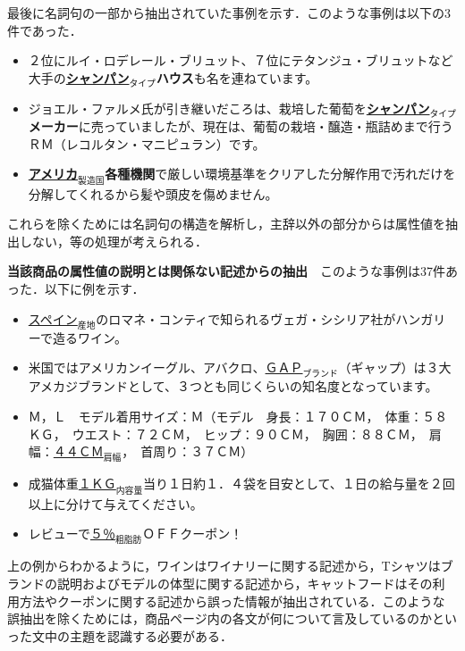 \documentclass[japanese]{jnlp_1.4}
\begin{document}
最後に名詞句の一部から抽出されていた事例を示す．このような事例は以下の3件であった．

\begin{itemize}
\item ２位にルイ・ロデレール・ブリュット、７位にテタンジュ・ブリュットなど　大手の{\bf \underline{シャンパン}$_{タイプ}$ハウス}も名を連ねています。
\item ジョエル・ファルメ氏が引き継いだころは、栽培した葡萄を{\bf \underline{シャンパン}$_{タイプ}$メーカー}に売っていましたが、現在は、葡萄の栽培・醸造・瓶詰めまで行うＲＭ（レコルタン・マニピュラン）です。
\item {\bf \underline{アメリカ}$_{製造国}$各種機関}で厳しい環境基準をクリアした分解作用で汚れだけを分解してくれるから髪や頭皮を傷めません。
\end{itemize}

\noindent
これらを除くためには名詞句の構造を解析し，主辞以外の部分からは属性値を抽出しない，等の処理が考えられる．


\vspace{1\Cvs}
\noindent
\textbf{当該商品の属性値の説明とは関係ない記述からの抽出}　このような事例は37件あった．以下に例を示す．

\begin{itemize}
\item \underline{スペイン}$_{産地}$のロマネ・コンティで知られるヴェガ・シシリア社がハンガリーで造るワイン。
\item 米国ではアメリカンイーグル、アバクロ、\underline{ＧＡＰ}$_{ブランド}$（ギャップ）は３大アメカジブランドとして、３つとも同じくらいの知名度となっています。
\item Ｍ，Ｌ　モデル着用サイズ：Ｍ（モデル　身長：１７０ＣＭ，　体重：５８ＫＧ，　ウエスト：７２ＣＭ，　ヒップ：９０ＣＭ，　胸囲：８８ＣＭ，　肩幅：\underline{４４ＣＭ}$_{肩幅}$，　首周り：３７ＣＭ）
\item 成猫体重\underline{１ＫＧ}$_{内容量}$当り１日約１．４袋を目安として、１日の給与量を２回以上に分けて与えてください。
\item レビューで\underline{５％}$_{粗脂肪}$ＯＦＦクーポン！
\end{itemize}

\noindent
上の例からわかるように，ワインはワイナリーに関する記述から，Tシャツはブ
ランドの説明およびモデルの体型に関する記述から，キャットフードはその利
用方法やクーポンに関する記述から誤った情報が抽出されている．このような
誤抽出を除くためには，商品ページ内の各文が何について言及しているのかといった文中の主題を認識する必要がある．
\end{document}
